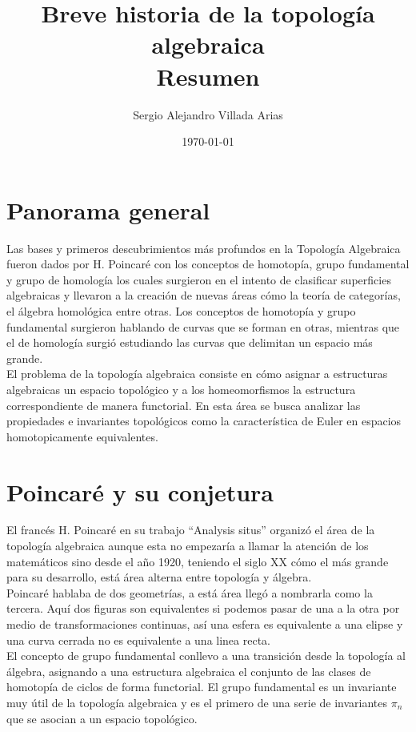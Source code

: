 \documentclass[12pt,letterpaper]{article}
\title{\vspace{-1.5cm}\textbf{Breve historia de la topología algebraica}\\[4pt]
\large Resumen}
\author{Sergio Alejandro Villada Arias} %
\date{\today}
\begin{document}
\maketitle

\section*{Panorama general}
Las bases y primeros descubrimientos más profundos en la Topología Algebraica fueron dados por H. Poincaré con los conceptos de homotopía, grupo fundamental y grupo de homología los cuales surgieron en el intento de clasificar superficies algebraicas y llevaron a la creación de nuevas áreas cómo la teoría de categorías, el álgebra homológica entre otras. Los conceptos de homotopía y grupo fundamental surgieron hablando de curvas que se forman en otras, mientras que el de homología surgió estudiando las curvas que delimitan un espacio más grande.\\

El problema de la topología algebraica consiste en cómo asignar a estructuras algebraicas un espacio topológico y a los homeomorfismos la estructura correspondiente de manera functorial. En esta área se busca analizar las propiedades e invariantes topológicos como la característica de Euler en espacios homotopicamente equivalentes.

\section*{Poincaré y su conjetura}
El francés H. Poincaré en su trabajo ``Analysis situs'' organizó el área de la topología algebraica aunque esta no empezaría a llamar la atención de los matemáticos sino desde el año 1920, teniendo el siglo XX cómo el más grande para su desarrollo, está área alterna entre topología y álgebra. \\

Poincaré hablaba de dos geometrías, a está área llegó a nombrarla como la tercera. Aquí dos figuras son equivalentes si podemos pasar de una a la otra por medio de transformaciones continuas, así una esfera es equivalente a una elipse y una curva cerrada no es equivalente a una linea recta.\\

El concepto de grupo fundamental conllevo a una transición desde la topología al álgebra, asignando a una estructura algebraica el conjunto de las clases de homotopía de ciclos de forma functorial. El grupo fundamental es un invariante muy útil de la topología algebraica y es el primero de una serie de invariantes $\pi_n$ que se asocian a un espacio topológico. \\
\end{document}
